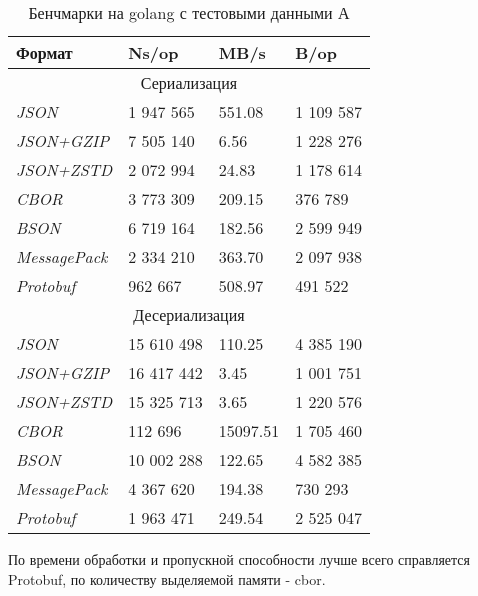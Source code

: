 \begin{table}[ht!]
\centering
\caption{Бенчмарки на golang с тестовыми данными А}
\begin{tabular}{|l|l|l|l|} 
\hline
\textbf{Формат}      & \textbf{Ns/op} & \textbf{MB/s} & \textbf{B/op}  \\ 
\hline
\multicolumn{4}{|c|}{Сериализация}                                        \\ 
\hline
\textit{JSON}        & 1 947 565        & 551.08        & 1 109 587        \\ 
\hline
\textit{JSON+GZIP}   & 7 505 140        & 6.56          & 1 228 276        \\ 
\hline
\textit{JSON+ZSTD}   & 2 072 994        & 24.83         & 1 178 614        \\ 
\hline
\textit{CBOR}        & 3 773 309        & 209.15        & 376 789         \\ 
\hline
\textit{BSON}        & 6 719 164        & 182.56        & 2 599 949        \\ 
\hline
\textit{MessagePack} & 2 334 210        & 363.70        & 2 097 938        \\ 
\hline
\textit{Protobuf}    & 962 667         & 508.97        & 491 522         \\ 
\hline
\multicolumn{4}{|c|}{Десериализация}                                      \\ 
\hline
\textit{JSON}        & 15 610 498       & 110.25        & 4 385 190        \\ 
\hline
\textit{JSON+GZIP}   & 16 417 442       & 3.45          & 1 001 751        \\ 
\hline
\textit{JSON+ZSTD}   & 15 325 713       & 3.65          & 1 220 576        \\ 
\hline
\textit{CBOR}        & 112 696         & 15097.51      & 1 705 460        \\ 
\hline
\textit{BSON}        & 10 002 288       & 122.65        & 4 582 385        \\ 
\hline
\textit{MessagePack} & 4 367 620        & 194.38        & 730 293         \\ 
\hline
\textit{Protobuf}    & 1 963 471        & 249.54        & 2 525 047        \\
\hline
\end{tabular}
\end{table}

По времени обработки и пропускной способности лучше всего справляется Protobuf, по количеству выделяемой памяти - cbor.  
\clearpage

